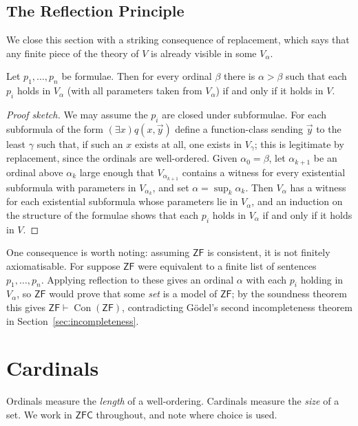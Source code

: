 \documentclass[a4paper]{scrartcl}
\newcommand{\ZF}{\mathsf{ZF}}
\newcommand{\ZFC}{\mathsf{ZFC}}
\newcommand{\Con}{\operatorname{Con}}
\begin{document}
\subsection{The Reflection Principle}

We close this section with a striking consequence of replacement, which says that any finite piece of the theory of $V$ is already visible in some $V_\alpha$.

\begin{theorem}
  Let $p_1, \dots, p_n$ be formulae. Then for every ordinal $\beta$ there is $\alpha > \beta$ such that each $p_i$ holds in $V_\alpha$ (with all parameters taken from $V_\alpha$) if and only if it holds in $V$.
\end{theorem}
\begin{proof}[Proof sketch]
  We may assume the $p_i$ are closed under subformulae. For each subformula of the form $(\exists x) q(x, \vec y)$ define a function-class sending $\vec y$ to the least $\gamma$ such that, if such an $x$ exists at all, one exists in $V_\gamma$; this is legitimate by replacement, since the ordinals are well-ordered. Given $\alpha_0 = \beta$, let $\alpha_{k+1}$ be an ordinal above $\alpha_k$ large enough that $V_{\alpha_{k+1}}$ contains a witness for every existential subformula with parameters in $V_{\alpha_k}$, and set $\alpha = \sup_k \alpha_k$. Then $V_\alpha$ has a witness for each existential subformula whose parameters lie in $V_\alpha$, and an induction on the structure of the formulae shows that each $p_i$ holds in $V_\alpha$ if and only if it holds in $V$.
\end{proof}

One consequence is worth noting: assuming $\ZF$ is consistent, it is not finitely axiomatisable. For suppose $\ZF$ were equivalent to a finite list of sentences $p_1, \dots, p_n$. Applying reflection to these gives an ordinal $\alpha$ with each $p_i$ holding in $V_\alpha$, so $\ZF$ would prove that some \emph{set} is a model of $\ZF$; by the soundness theorem this gives $\ZF \vdash \Con(\ZF)$, contradicting G\"odel's second incompleteness theorem in Section~\ref{sec:incompleteness}.

\section{Cardinals}\label{sec:cardinals}

Ordinals measure the \emph{length} of a well-ordering. Cardinals measure the \emph{size} of a set. We work in $\ZFC$ throughout, and note where choice is used.
\end{document}
